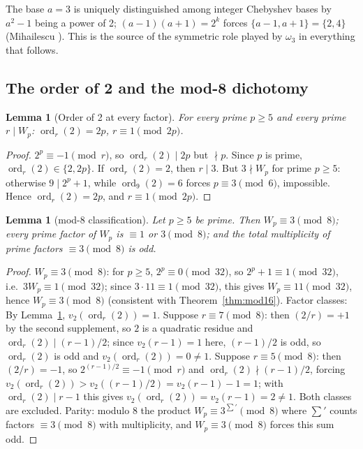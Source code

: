 \documentclass[11pt]{amsart}
\theoremstyle{plain}
\newtheorem{lemma}[theorem]{Lemma}
\theoremstyle{definition}
\theoremstyle{remark}
\numberwithin{equation}{section}
\newcommand{\ord}{\operatorname{ord}}
\begin{document}
The base $a = 3$ is uniquely distinguished among integer Chebyshev bases by $a^2 - 1$ being a power of 2; $(a-1)(a+1) = 2^k$ forces $\{a - 1, a + 1\} = \{2, 4\}$ (Mihailescu \cite{ref:Mihailescu}). This is the source of the symmetric role played by $\omega_3$ in everything that follows.

\subsection{The order of 2 and the mod-8 dichotomy}

\begin{lemma}[Order of 2 at every factor]\label{lem:ord2}
For every prime $p \geq 5$ and every prime $r \mid W_p$: $\ord_r(2) = 2p$, $r \equiv 1 \pmod{2p}$.
\end{lemma}

\begin{proof}
$2^p \equiv -1 \pmod r$, so $\ord_r(2) \mid 2p$ but $\nmid p$. Since $p$ is prime, $\ord_r(2) \in \{2, 2p\}$. If $\ord_r(2)=2$, then $r\mid 3$. But $3\nmid W_p$ for prime $p\geq5$: otherwise $9\mid 2^p+1$, while $\ord_9(2)=6$ forces $p\equiv3\pmod6$, impossible. Hence $\ord_r(2)=2p$, and $r\equiv1\pmod{2p}$.
\end{proof}

\begin{lemma}[mod-8 classification]\label{lem:mod8}
Let $p \geq 5$ be prime. Then $W_p \equiv 3 \pmod 8$; every prime factor of $W_p$ is $\equiv 1$ or $3 \pmod 8$; and the total multiplicity of prime factors $\equiv 3 \pmod 8$ is odd.
\end{lemma}

\begin{proof}
$W_p \equiv 3 \pmod 8$: for $p \geq 5$, $2^p \equiv 0 \pmod{32}$, so $2^p + 1 \equiv 1 \pmod{32}$, i.e.\ $3 W_p \equiv 1 \pmod{32}$; since $3 \cdot 11 \equiv 1 \pmod{32}$, this gives $W_p \equiv 11 \pmod{32}$, hence $W_p \equiv 3 \pmod 8$ (consistent with Theorem~\ref{thm:mod16}). Factor classes: By Lemma~\ref{lem:ord2}, $v_2(\ord_r(2)) = 1$. Suppose $r \equiv 7 \pmod 8$: then $(2/r) = +1$ by the second supplement, so $2$ is a quadratic residue and $\ord_r(2) \mid (r-1)/2$; since $v_2(r-1) = 1$ here, $(r-1)/2$ is odd, so $\ord_r(2)$ is odd and $v_2(\ord_r(2)) = 0 \neq 1$. Suppose $r \equiv 5 \pmod 8$: then $(2/r) = -1$, so $2^{(r-1)/2} \equiv -1 \pmod r$ and $\ord_r(2) \nmid (r-1)/2$, forcing $v_2(\ord_r(2)) > v_2((r-1)/2) = v_2(r-1) - 1 = 1$; with $\ord_r(2) \mid r-1$ this gives $v_2(\ord_r(2)) = v_2(r-1) = 2 \neq 1$. Both classes are excluded. Parity: modulo 8 the product $W_p \equiv 3^{\sum'} \pmod 8$ where $\sum'$ counts factors $\equiv 3 \pmod 8$ with multiplicity, and $W_p \equiv 3 \pmod 8$ forces this sum odd.
\end{proof}
\end{document}
